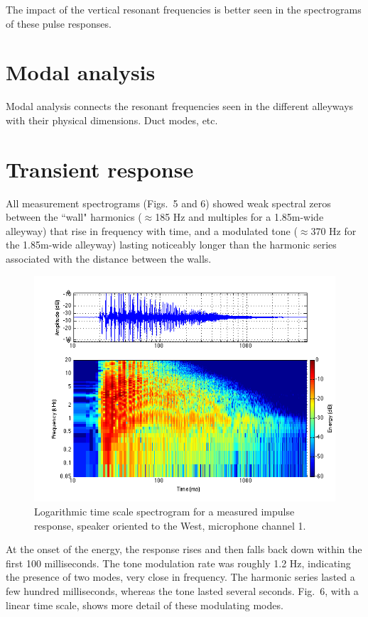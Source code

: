 \documentclass{aes137}
\begin{document}
The impact of the vertical resonant frequencies is better seen in the spectrograms of these pulse responses. 

\section{Modal analysis}

Modal analysis connects the resonant frequencies seen in the different
alleyways with their physical dimensions. Duct modes, etc.

\section{Transient response}

All measurement spectrograms (Figs.~5 and 6) showed weak spectral
zeros between the ``wall" harmonics ($\approx$185 Hz and multiples for
a 1.85m-wide alleyway) that rise in frequency with time, and a
modulated tone ($\approx$370 Hz for the 1.85m-wide alleyway) lasting
noticeably longer than the harmonic series associated with the
distance between the walls.

\begin{figure}[h] \centering \includegraphics[width=\linewidth, trim=10mm 5mm 2mm 7mm, clip]{images/logspectrogram.png} 
\caption{Logarithmic time scale spectrogram for a measured impulse
  response, speaker oriented to the West, microphone channel 1.}
\end{figure}

At the onset of the energy, the response rises and then falls back
down within the first 100 milliseconds. The tone modulation rate was
roughly 1.2 Hz, indicating the presence of two modes, very close in
frequency. The harmonic series lasted a few hundred milliseconds,
whereas the tone lasted several seconds. Fig.~6, with a linear time
scale, shows more detail of these modulating modes.
\end{document}
